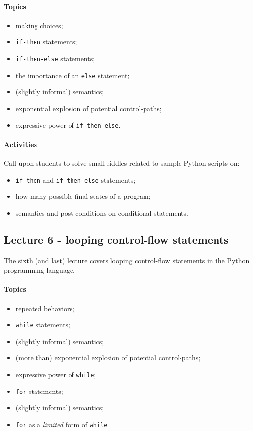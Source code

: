 				\paragraph*{Topics}
					\begin{itemize}
						\item making choices;
						\item \texttt{if-then} statements;
						\item \texttt{if-then-else} statements;
						\item the importance of an \texttt{else} statement;
						\item (slightly informal) semantics;
						\item exponential explosion of potential control-paths;
						\item expressive power of \texttt{if-then-else}.
					\end{itemize}

				\paragraph*{Activities}
					Call upon students to solve small riddles related to sample Python scripts on:

					\begin{itemize}
						\item \texttt{if-then} and \texttt{if-then-else} statements;
						\item how many possible final states of a program;
						\item semantics and post-conditions on conditional statements.
					\end{itemize}


			\subsection{Lecture 6 - looping control-flow statements}
				The sixth (and last) lecture covers looping control-flow statements in the Python programming language.

				\paragraph*{Topics}
					\begin{itemize}
						\item repeated behaviors;
						\item \texttt{while} statements;
						\item (slightly informal) semantics;
						\item (more than) exponential explosion of potential control-paths;
						\item expressive power of \texttt{while};
						\item \texttt{for} statements;
						\item (slightly informal) semantics;
						\item \texttt{for} as a \textit{limited} form of \texttt{while}.
					\end{itemize}

